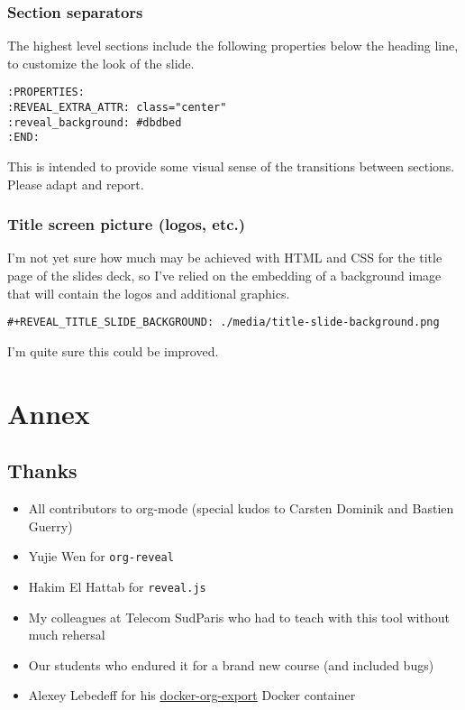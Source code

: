 \documentclass[a4paper]{article}
\begin{document}
\subsubsection{Section separators}
\label{sec:org5a0d7a1}

The highest level sections include the following properties below the heading line, to customize the look of the slide. 

\begin{verbatim}
:PROPERTIES:
:REVEAL_EXTRA_ATTR: class="center"
:reveal_background: #dbdbed
:END:
\end{verbatim}

This is intended to provide some visual sense of the transitions between sections. Please adapt and report.

\subsubsection{Title screen picture (logos, etc.)}
\label{sec:org2eee4cb}

I'm not yet sure how much may be achieved with HTML and CSS for the
title page of the slides deck, so I've relied on the embedding of a
background image that will contain the logos and additional graphics. 

\begin{verbatim}
#+REVEAL_TITLE_SLIDE_BACKGROUND: ./media/title-slide-background.png
\end{verbatim}

I'm quite sure this could be improved.


\section{Annex}
\label{sec:orgbe45175}

\subsection{Thanks}
\label{sec:org1e69cae}

\begin{itemize}
\item All contributors to org-mode (special kudos to Carsten Dominik and Bastien Guerry)
\item Yujie Wen for \texttt{org-reveal}
\item Hakim El Hattab for \texttt{reveal.js}
\item My colleagues at Telecom SudParis who had to teach with this tool without much rehersal
\item Our students who endured it for a brand new course (and included bugs)
\item Alexey Lebedeff for his
\href{https://github.com/binarin/docker-org-export}{docker-org-export}
Docker container
\end{itemize}
\end{document}
